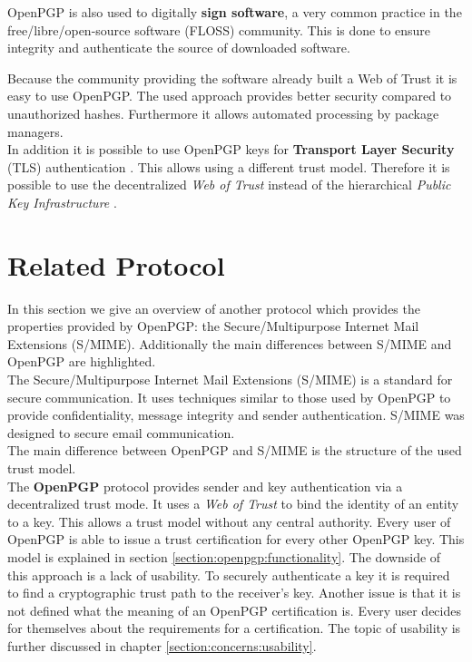 OpenPGP is also used to digitally \textbf{sign software}, a very common practice in the free/libre/open-source software (FLOSS) community. This is done to ensure integrity and authenticate the source of downloaded software. 

Because the community providing the software already built a Web of Trust it is easy to use OpenPGP. The used approach provides better security compared to unauthorized hashes. Furthermore it allows automated processing by package managers. \\

In addition it is possible to use OpenPGP keys for \textbf{Transport Layer Security} (TLS) authentication \cite{RFC6091}. This allows using a different trust model. Therefore it is possible to use the decentralized \textit{Web of Trust} instead of the hierarchical \textit{Public Key Infrastructure} \citep{RFC5280}. 

\section{Related Protocol} \label{section:openpgp:smime}

In this section we give an overview of another protocol which provides the properties provided by OpenPGP: the Secure/Multipurpose Internet Mail Extensions (S/MIME). Additionally the main differences between S/MIME and OpenPGP are highlighted. \\

The Secure/Multipurpose Internet Mail Extensions (S/MIME) \citep{RFC5751} is a standard for secure communication. It uses techniques similar to those used by OpenPGP to provide confidentiality, message integrity and sender authentication. S/MIME was designed to secure email communication.  \\

The main difference between OpenPGP and S/MIME is the structure of the used trust model.  \\

The \textbf{OpenPGP} protocol provides sender and key authentication via a decentralized trust mode. It uses a \textit{Web of Trust} to bind the identity of an entity to a key. This allows a trust model without any central authority. Every user of OpenPGP is able to issue a trust certification for every other OpenPGP key. This model is explained in section \ref{section:openpgp:functionality}. The downside of this approach is a lack of usability. To securely authenticate a key it is required to find a cryptographic trust path to the receiver's key. Another issue is that it is not defined what the meaning of an OpenPGP certification is. Every user decides for themselves about the requirements for a certification. The topic of usability is further discussed in chapter \ref{section:concerns:usability}. \\

